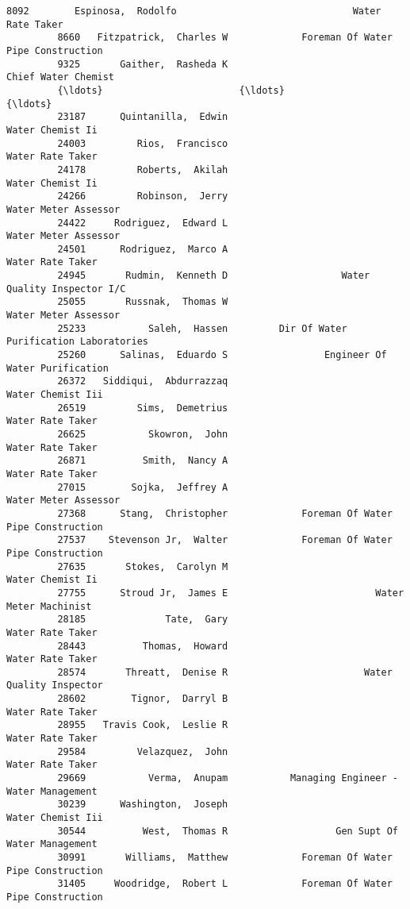 \documentclass[11pt]{article}
\begin{document}
\begin{Verbatim}[commandchars=\\\{\}]
         8092        Espinosa,  Rodolfo                               Water Rate Taker   
         8660   Fitzpatrick,  Charles W             Foreman Of Water Pipe Construction   
         9325       Gaither,  Rasheda K                            Chief Water Chemist   
         {\ldots}                        {\ldots}                                            {\ldots}   
         23187      Quintanilla,  Edwin                               Water Chemist Ii   
         24003         Rios,  Francisco                               Water Rate Taker   
         24178         Roberts,  Akilah                               Water Chemist Ii   
         24266         Robinson,  Jerry                           Water Meter Assessor   
         24422     Rodriguez,  Edward L                           Water Meter Assessor   
         24501      Rodriguez,  Marco A                               Water Rate Taker   
         24945       Rudmin,  Kenneth D                    Water Quality Inspector I/C   
         25055       Russnak,  Thomas W                           Water Meter Assessor   
         25233           Saleh,  Hassen         Dir Of Water Purification Laboratories   
         25260      Salinas,  Eduardo S                 Engineer Of Water Purification   
         26372   Siddiqui,  Abdurrazzaq                              Water Chemist Iii   
         26519         Sims,  Demetrius                               Water Rate Taker   
         26625           Skowron,  John                               Water Rate Taker   
         26871          Smith,  Nancy A                               Water Rate Taker   
         27015        Sojka,  Jeffrey A                           Water Meter Assessor   
         27368      Stang,  Christopher             Foreman Of Water Pipe Construction   
         27537    Stevenson Jr,  Walter             Foreman Of Water Pipe Construction   
         27635       Stokes,  Carolyn M                               Water Chemist Ii   
         27755      Stroud Jr,  James E                          Water Meter Machinist   
         28185              Tate,  Gary                               Water Rate Taker   
         28443          Thomas,  Howard                               Water Rate Taker   
         28574       Threatt,  Denise R                        Water Quality Inspector   
         28602        Tignor,  Darryl B                               Water Rate Taker   
         28955   Travis Cook,  Leslie R                               Water Rate Taker   
         29584         Velazquez,  John                               Water Rate Taker   
         29669           Verma,  Anupam           Managing Engineer - Water Management   
         30239      Washington,  Joseph                              Water Chemist Iii   
         30544          West,  Thomas R                   Gen Supt Of Water Management   
         30991       Williams,  Matthew             Foreman Of Water Pipe Construction   
         31405     Woodridge,  Robert L             Foreman Of Water Pipe Construction   
         

\end{Verbatim}
\end{document}
